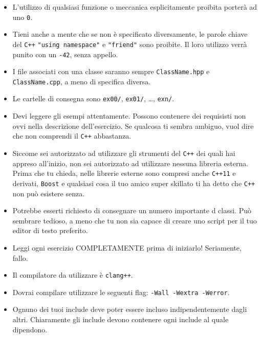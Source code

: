 \begin{itemize}
\begin{itemize}
		  \end{itemize}
		
		\item L'utilizzo di qualsiasi funzione o meccanica esplicitamente
		proibita porterà ad uno \texttt{0}.

	\item Tieni anche a mente che se non è specificato diversamente, 
		le parole chiave del \texttt{C++}  \texttt{"using namespace"} e \texttt{"friend"}
		sono proibite. Il loro utilizzo verrà punito con un \texttt{-42}, senza appello.

	\item I file associati con una classe saranno sempre
          \texttt{ClassName.hpp} e \texttt{ClassName.cpp}, a meno
          di specifica diversa.

	\item Le cartelle di consegna sono \texttt{ex00/}, \texttt{ex01/},
          \dots, \texttt{exn/}.
       

	\item Devi leggere gli esempi attentamente. Possono contenere
	dei requisisti non ovvi nella descrizione dell'esercizio. Se qualcosa ti sembra
	 ambiguo, vuol dire che non comprendi il \texttt{C++} abbastanza.
        

	\item Siccome sei autorizzato ad utilizzare gli strumenti del \texttt{C++} 
	dei quali hai appreso all'inizio, non sei autorizzato ad utilizzare nessuna
	libreria esterna. Prima che tu chieda, nelle librerie esterne sono
	compresi anche \texttt{C++11} e derivati, \texttt{Boost} e qualsiasi cosa il 
	tuo amico super skillato ti ha detto che \texttt{C++} non può esistere senza.

	\item Potrebbe esserti richiesto di consegnare un numero importante d classi.
	Può sembrare tedioso, a meno che tu non sia capace di creare uno script
	per il tuo editor di testo preferito.

        \item Leggi ogni esercizio COMPLETAMENTE prima di iniziarlo!
        Seriamente, fallo.
        
        \item Il compilatore da utilizzare è \texttt{clang++}.

        \item Dovrai compilare utilizzare le seguenti flag: \texttt{-Wall -Wextra -Werror}.

	\item Ognuno dei tuoi include deve poter essere incluso indipendentemente
	dagli altri. Chiaramente gli include devono contenere ogni include al quale dipendono.


\end{itemize}
